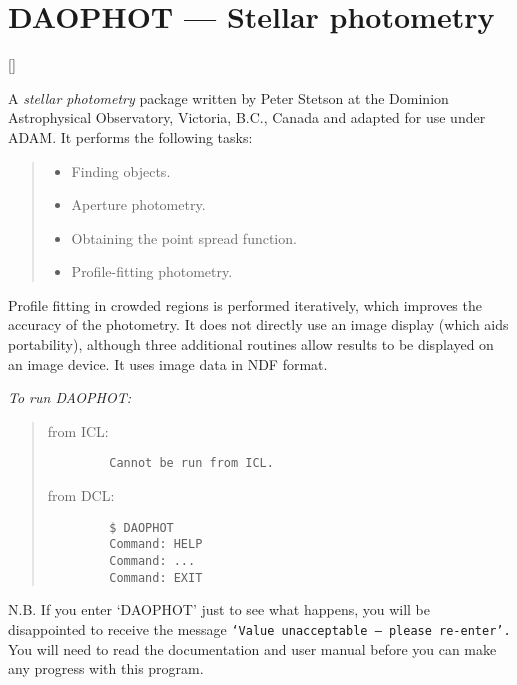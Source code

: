 \newpage

\section{DAOPHOT --- Stellar photometry} 

\vspace{-11mm}

\hfill []

\vspace{5mm}

A {\em stellar photometry} package written by Peter Stetson at the Dominion
Astrophysical Observatory, Victoria, B.C., Canada and adapted for use under
ADAM.
It performs the following tasks:

{\small
\begin{quote}
\begin{itemize}
\item Finding objects.
\item Aperture photometry.
\item Obtaining the point spread function.
\item Profile-fitting photometry.
\end{itemize}
\end{quote}

}
Profile fitting in crowded regions is performed iteratively, which improves the
accuracy of the photometry.
It does not directly use an image display (which aids portability), although
three additional routines allow results to be displayed on an image device.
It uses image data in NDF format.

{\em To run DAOPHOT:}\hfill
\begin{quote}
\begin{description}

\item [from ICL:] \hfill

\begin{small}
\begin{verbatim}
   Cannot be run from ICL.
\end{verbatim}
\end{small}

\item [from DCL:] \hfill

\begin{small}
\begin{verbatim}
   $ DAOPHOT
   Command: HELP
   Command: ...
   Command: EXIT
\end{verbatim}
\end{small}

\end{description}
\end{quote}
N.B. If you enter `DAOPHOT' just to see what happens, you will be disappointed
to receive the message {\tt `Value unacceptable --- please re-enter'.}
You will need to read the documentation and user manual before you can
make any progress with this program.

